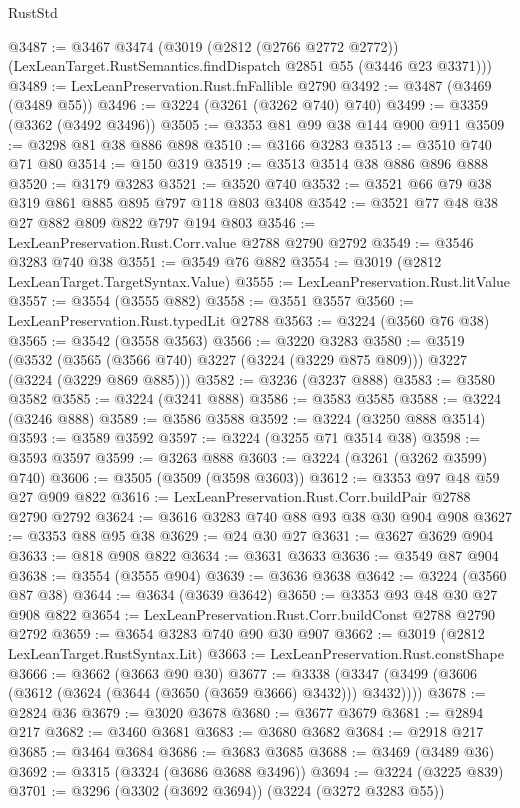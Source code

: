 \begin{lexlean}{RustStd}
\begin{coremodule}
@3487 := @3467
    @3474
    (@3019
      (@2812 (@2766 @2772 @2772))
      (LexLeanTarget.RustSemantics.findDispatch @2851 @55 (@3446 @23 @3371)))
@3489 := LexLeanPreservation.Rust.fnFallible @2790
@3492 := @3487 (@3469 (@3489 @55))
@3496 := @3224 (@3261 (@3262 @740) @740)
@3499 := @3359 (@3362 (@3492 @3496))
@3505 := @3353 @81 @99 @38 @144 @900 @911
@3509 := @3298 @81 @38 @886 @898
@3510 := @3166 @3283
@3513 := @3510 @740 @71 @80
@3514 := @150 @319
@3519 := @3513 @3514 @38 @886 @896 @888
@3520 := @3179 @3283
@3521 := @3520 @740
@3532 := @3521 @66 @79 @38 @319 @861 @885 @895 @797 @118 @803 @3408
@3542 := @3521 @77 @48 @38 @27 @882 @809 @822 @797 @194 @803
@3546 := LexLeanPreservation.Rust.Corr.value @2788 @2790 @2792
@3549 := @3546 @3283 @740 @38
@3551 := @3549 @76 @882
@3554 := @3019 (@2812 LexLeanTarget.TargetSyntax.Value)
@3555 := LexLeanPreservation.Rust.litValue
@3557 := @3554 (@3555 @882)
@3558 := @3551 @3557
@3560 := LexLeanPreservation.Rust.typedLit @2788
@3563 := @3224 (@3560 @76 @38)
@3565 := @3542 (@3558 @3563)
@3566 := @3220 @3283
@3580 := @3519
    (@3532 (@3565 (@3566 @740) @3227 (@3224 (@3229 @875 @809))) @3227 (@3224 (@3229 @869 @885)))
@3582 := @3236 (@3237 @888)
@3583 := @3580 @3582
@3585 := @3224 (@3241 @888)
@3586 := @3583 @3585
@3588 := @3224 (@3246 @888)
@3589 := @3586 @3588
@3592 := @3224 (@3250 @888 @3514)
@3593 := @3589 @3592
@3597 := @3224 (@3255 @71 @3514 @38)
@3598 := @3593 @3597
@3599 := @3263 @888
@3603 := @3224 (@3261 (@3262 @3599) @740)
@3606 := @3505 (@3509 (@3598 @3603))
@3612 := @3353 @97 @48 @59 @27 @909 @822
@3616 := LexLeanPreservation.Rust.Corr.buildPair @2788 @2790 @2792
@3624 := @3616 @3283 @740 @88 @93 @38 @30 @904 @908
@3627 := @3353 @88 @95 @38
@3629 := @24 @30 @27
@3631 := @3627 @3629 @904
@3633 := @818 @908 @822
@3634 := @3631 @3633
@3636 := @3549 @87 @904
@3638 := @3554 (@3555 @904)
@3639 := @3636 @3638
@3642 := @3224 (@3560 @87 @38)
@3644 := @3634 (@3639 @3642)
@3650 := @3353 @93 @48 @30 @27 @908 @822
@3654 := LexLeanPreservation.Rust.Corr.buildConst @2788 @2790 @2792
@3659 := @3654 @3283 @740 @90 @30 @907
@3662 := @3019 (@2812 LexLeanTarget.RustSyntax.Lit)
@3663 := LexLeanPreservation.Rust.constShape
@3666 := @3662 (@3663 @90 @30)
@3677 := @3338 (@3347 (@3499 (@3606 (@3612 (@3624 (@3644 (@3650 (@3659 @3666) @3432))) @3432))))
@3678 := @2824 @36
@3679 := @3020 @3678
@3680 := @3677 @3679
@3681 := @2894 @217
@3682 := @3460 @3681
@3683 := @3680 @3682
@3684 := @2918 @217
@3685 := @3464 @3684
@3686 := @3683 @3685
@3688 := @3469 (@3489 @36)
@3692 := @3315 (@3324 (@3686 @3688 @3496))
@3694 := @3224 (@3225 @839)
@3701 := @3296 (@3302 (@3692 @3694)) (@3224 (@3272 @3283 @55))

\end{coremodule}
\end{lexlean}
